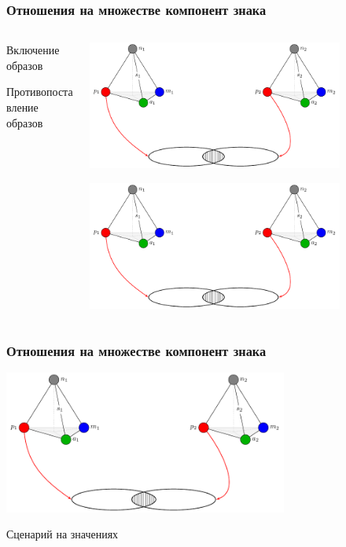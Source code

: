 \documentclass[default]{beamer}
\begin{document}
	\begin{frame}
		\frametitle{Отношения на множестве компонент знака}
		
		\begin{columns}
			\begin{column}{0.3\textwidth}
				\centering
				Включение образов 
				\par\bigskip
				\par\bigskip
				\par\bigskip
				\par\bigskip
				\par\bigskip
				Противопоставление образов 
				
			\end{column}
			\begin{column}{0.7\textwidth}
				\includegraphics[page=2,width=0.8\textwidth]{signs/sign_relations}
				
				\includegraphics[page=3,width=0.8\textwidth]{signs/sign_relations}
			\end{column}
		\end{columns}
		
	\end{frame}	
	
	\begin{frame}
		\frametitle{Отношения на множестве компонент знака}
		\centering
		\includegraphics[page=4,width=0.7\textwidth]{signs/sign_relations}
		
		Сценарий на значениях
	\end{frame}	
	
\end{document}
